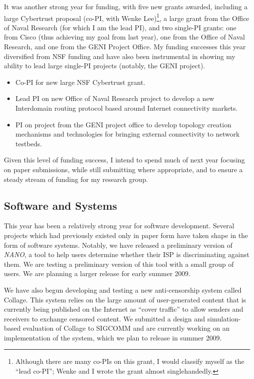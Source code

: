 \begin{sloppypar}
It was another strong year for funding, with five new grants awarded,
including a large Cybertrust proposal (co-PI, with Wenke
Lee)\footnote{Although there are many co-PIs on this grant, I would
classify myself as the ``lead co-PI''; Wenke and I wrote the grant
almost singlehandedly.}, a large grant from the Office of Naval Research
(for which I am the lead PI), and two single-PI grants: one from Cisco
(thus achieving my goal from last year), one from the Office of Naval
Research, and one from the GENI Project Office.  My funding successes
this year diversified from NSF funding and have also been instrumental
in showing my ability to lead large single-PI projects (notably, the
GENI project).

\begin{itemize}
\itemsep=-1pt
\item Co-PI for new large NSF Cybertrust grant.
\item Lead PI on new Office of Naval Research project to develop a new
Interdomain routing protocol based around Internet connectivity markets.
\item PI on project from the GENI project office to develop topology
creation mechanisms and technologies for bringing external connectivity
to network testbeds.
\end{itemize}
\noindent
Given this level of funding success, I intend to spend much of next
year focusing on paper submissions, while still submitting where
appropriate, and to ensure a steady stream of funding for my research
group.

\subsection*{Software and Systems}

This year has been a relatively strong year for software development.
Several projects which had previously existed only in paper form have
taken shape in the form of software systems.  Notably, we have released
a preliminary version of {\em NANO}, a tool to help users determine
whether their ISP is discriminating against them.  We are testing a
preliminary version of this tool with a small group of users.  We are
planning a larger release for early summer 2009.  

We have also begun developing and testing a new anti-censorship system
called Collage.  This system relies on the large amount of
user-generated content that is currently being published on the Internet
as ``cover traffic'' to allow senders and receivers to exchange censored
content.  We submitted a design and simulation-based evaluation of
Collage to SIGCOMM and are currently working on an implementation of the
system, which we plan to release in summer 2009.


\end{sloppypar}
